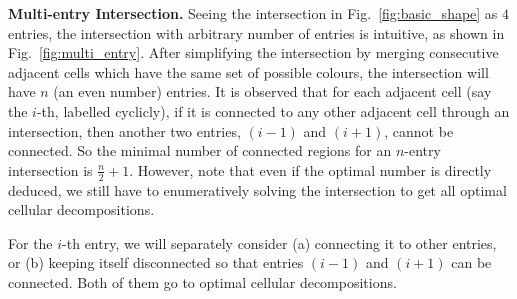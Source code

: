 \documentclass[journal]{IEEEtran}
\begin{document}
\textbf{Multi-entry Intersection.}
Seeing the intersection in Fig.~\ref{fig:basic_shape} as $4$ entries, the intersection with arbitrary number of entries is intuitive, as shown in Fig.~\ref{fig:multi_entry}. After simplifying the intersection by merging consecutive adjacent cells which have the same set of possible colours, the intersection will have $n$ (an even number) entries. 
It is observed that for each adjacent cell (say the $i$-th, labelled cyclicly), if it is connected to any other adjacent cell through an intersection, then another two entries, $(i-1)$ and $(i+1)$, cannot be connected. So the minimal number of connected regions for an $n$-entry intersection is $\frac{n}{2}+1$. 
However, note that even if the optimal number is directly deduced, we still have to enumeratively solving the intersection to get all optimal cellular decompositions. 

For the $i$-th entry, we will separately consider (a) connecting it to other entries, or (b) keeping itself disconnected so that entries $(i-1)$ and $(i+1)$ can be connected. Both of them go to optimal cellular decompositions. 
\end{document}
